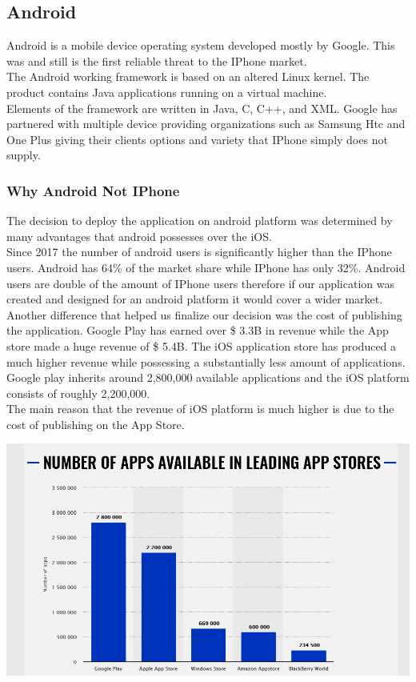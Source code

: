 \documentclass[a4paper,12pt,twoside]{report}
\begin{document}
\subsection{Android}

Android is a mobile device operating system developed mostly by Google. This was and still is the first reliable threat to the IPhone market.
\\
The Android working framework is based on an altered Linux kernel. The product contains Java applications running on a virtual machine. \\

Elements of the framework are written in Java, C, C++, and XML.
Google has partnered with multiple device providing organizations such as Samsung Htc and One Plus giving their clients options and variety that IPhone simply does not supply.
\cite{butler2010android}\\
\subsubsection{Why Android Not IPhone}
The decision to deploy the application on android platform was determined by many advantages that android possesses over the iOS.\\
Since 2017 the number of android users is significantly higher than the IPhone users. Android has 64\% of the market share while IPhone has only 32\%.
Android users are double of the amount of IPhone users therefore if our application was created and designed for an android platform it would cover a wider market.\\

Another difference that helped us finalize our decision was the cost of publishing the application. Google Play has earned over \$ 3.3B in revenue while the App store made a huge revenue of \$ 5.4B. The iOS application store has produced a much higher revenue while possessing a substantially less amount of applications. Google play inherits around 2,800,000 available applications and the iOS platform consists of roughly 2,200,000.   
\\
The main reason that the revenue of iOS platform is much higher is due to the cost of publishing on the App Store.
\cite{android&iOS}

\begin{center}
\includegraphics[scale=.4]{images/androidvsios.png}
\end{center}
\end{document}
